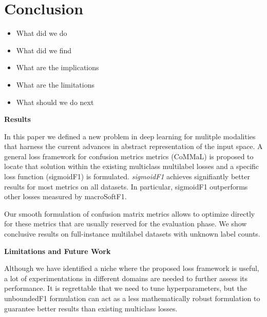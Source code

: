 
\section{Conclusion}
\label{sec:orged3d8a1}
\begin{itemize}[leftmargin=*]
\item What did we do
\item What did we find
\item What are the implications
\item What are the limitations
\item What should we do next
\end{itemize}


\textbf{Results}

In this paper we defined a new problem in deep learning for mulitple modalities that harness the current advances in abstract representation of the input space. A general loss framework for confusion metrics metrics (CoMMaL) is proposed to locate that solution within the existing multiclass multilabel losses and a specific loss function (sigmoidF1) is formulated. \emph{sigmoidF1} achieves signifiantly better results for most metrics on all datasets. In particular, sigmoidF1 outperforms other losses measured by macroSoftF1.

Our smooth formulation of confusion matrix metrics allows to optimize directly for these metrics that are usually reserved for the evaluation phase. We show conclusive results on full-instance multilabel datasets with unknown label counts.

\textbf{Limitations and Future Work}

Although we have identified a niche where the proposed loss framework is useful, a lot of experimentations in different domains are needed to further assess its performance. It is regrettable that we need to tune hyperparameters, but the unboundedF1 formulation can act as a less mathematically robust formulation to guarantee better results than existing multiclass losses.







